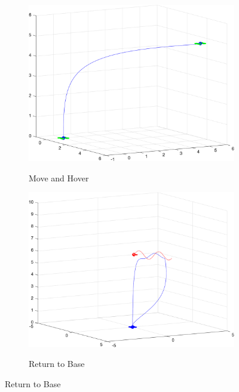 \documentclass{article}
\begin{document}
\begin{multicols}{2}
\begin{figure}[H]
\centering
\begin{subfigure}[b]{0.45\columnwidth}
    \centering
    \includegraphics[width = 1\textwidth]{images/MoveAndHover.png}
     \label{fig:MandH}
     \vspace{-5mm}
     \caption{Move and Hover}
\end{subfigure}
\begin{subfigure}[b]{0.45\columnwidth}
    \centering
    \includegraphics[width = 1\textwidth]{images/ReturnToBase.png}
     \label{fig:Return}
     \vspace{-5mm}
      \caption{Return to Base}
 \end{subfigure}

\end{figure}
\end{multicols}
\end{document}
